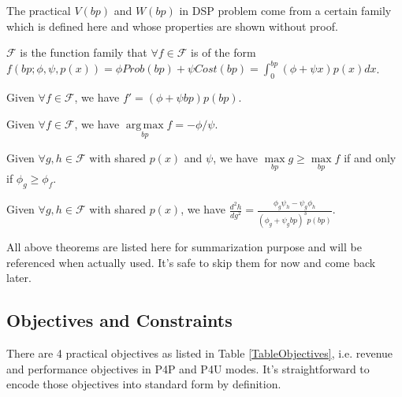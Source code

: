 \documentclass[sigconf]{acmart}
\DeclareMathOperator*{\argmax}{arg\,max}
\newcommand{\pprob}{\phi}
\newcommand{\pcost}{\psi}
\newcommand{\uff}{\mathscr{F}}
\newcommand{\uf}{f(bp; \pprob, \pcost, p(x))}
\begin{document}
The practical $V(bp)$ and $W(bp)$ in DSP problem come from a certain family
    which is defined here and whose properties are shown without proof.

\begin{definition}
$\uff$ is the function family that $\forall f \in \uff$ is of the form
    $ \uf = \pprob Prob(bp) + \pcost Cost(bp) = \int_0^{bp} (\pprob + \pcost x)p(x)dx $.
\end{definition}

\begin{theorem} \label{DerivationTheorem}
Given $\forall f \in \uff$, we have $f'=(\pprob + \pcost{}bp)p(bp)$.
\end{theorem}

\begin{theorem} \label{ArgMaxTheorem}
Given $\forall f \in \uff$, we have $\argmax\limits_{bp} f = - \pprob / \pcost$.
\end{theorem}

\begin{theorem} \label{ComparisonTheorem}
Given $\forall g,h \in \uff$ with shared $p(x)$ and $\pcost$, we have $\max\limits_{bp} g \ge \max\limits_{bp} f$
    if and only if $\pprob_g \ge \pprob_f$.
\end{theorem}

\begin{theorem} \label{SecondDerivationTheorem}
Given $\forall g,h \in \uff$ with shared $p(x)$,
    we have $\frac{d^2h}{dg^2} = \frac{\pprob_g \pcost_h - \pcost_g \pprob_h}{(\pprob_g + \pcost_g bp)^3 p(bp)}$.
\end{theorem}

All above theorems are listed here for summarization purpose and will be referenced when actually used.
It's safe to skip them for now and come back later.

\subsection{Objectives and Constraints} \label{ObjectivesAndConstraints}

There are 4 practical objectives as listed in Table \ref{TableObjectives},
    i.e. revenue and performance objectives in P4P and P4U modes.
It's straightforward to encode those objectives into standard form by definition.
\end{document}

